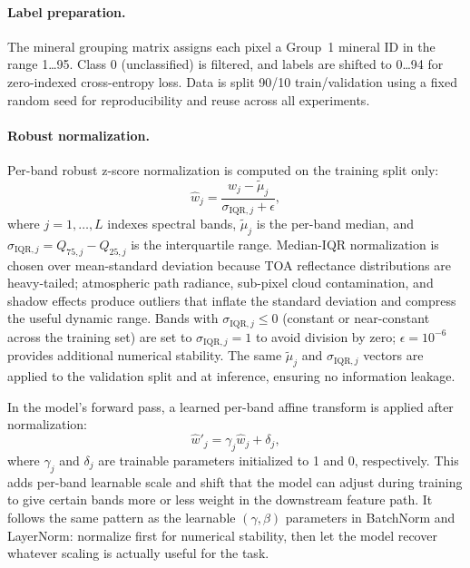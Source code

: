 \documentclass[11pt]{report}
\begin{document}
\paragraph{Label preparation.}
The mineral grouping matrix assigns each pixel a Group~1 mineral ID in the range 1\ldots95. 
Class 0 (unclassified) is filtered, and labels are shifted to 0\ldots94 for zero-indexed cross-entropy loss.
Data is split 90/10 train/validation using a fixed random seed for reproducibility and reuse across all experiments.

\paragraph{Robust normalization.}
Per-band robust z-score normalization is computed on the training split only:
\begin{equation}
\hat{w}_{j} = \frac{w_{j} - \tilde{\mu}_j}{\sigma_{\text{IQR},j} + \epsilon},
\label{eq:robust_norm}
\end{equation}
where $j = 1, \ldots, L$ indexes spectral bands, $\tilde{\mu}_j$ is the per-band median, and $\sigma_{\text{IQR},j} = Q_{75,j} - Q_{25,j}$ is the interquartile range. 
Median-IQR normalization is chosen over mean-standard deviation because TOA reflectance distributions are heavy-tailed;
atmospheric path radiance, sub-pixel cloud contamination, and shadow effects produce outliers that inflate the standard deviation and compress the useful dynamic range. 
Bands with $\sigma_{\text{IQR},j} \leq 0$ (constant or near-constant across the training set) are set to $\sigma_{\text{IQR},j} = 1$ to avoid division by zero; 
$\epsilon = 10^{-6}$ provides additional numerical stability. The same $\tilde{\mu}_j$ and $\sigma_{\text{IQR},j}$ vectors are applied to the validation split and at inference, ensuring no information leakage.

In the model's forward pass, a learned per-band affine transform is applied after normalization:
\begin{equation}
\hat{w}'_j = \gamma_j \hat{w}_j + \delta_j,
\label{eq:learnable_scale}
\end{equation}
where $\gamma_j$ and $\delta_j$ are trainable parameters initialized to 1 and 0, respectively. This adds per-band learnable scale and shift that the model can adjust during training to give certain bands more or less weight in the downstream feature path. It follows the same pattern as the learnable $(\gamma, \beta)$ parameters in BatchNorm and LayerNorm: normalize first for numerical stability, then let the model recover whatever scaling is actually useful for the task.
\end{document}
